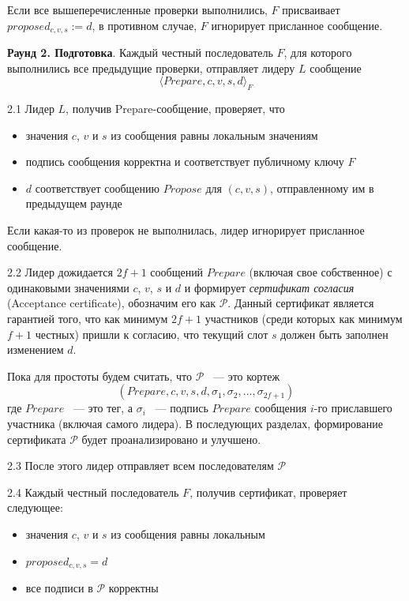 Если все вышеперечисленные проверки выполнились, $F$ присваивает $proposed_{c,v,s} := d$, в противном случае, $F$ игнорирует присланное сообщение. 
\vspace{10pt}

\textbf{Раунд 2. Подготовка}. Каждый честный последователь $F$, для которого выполнились все предыдущие проверки, отправляет лидеру $L$ сообщение 
\[ \langle Prepare, c, v, s, d \rangle_F \]

2.1 Лидер $L$, получив Prepare-сообщение, проверяет, что
\begin{itemize}
\item значения $c$, $v$ и $s$ из сообщения равны локальным значениям
\item подпись сообщения корректна и соответствует публичному ключу $F$
\item $d$ соответствует сообщению $Propose$ для $(c, v, s)$, отправленному им в предыдущем раунде
\end{itemize}
Если какая-то из проверок не выполнилась, лидер игнорирует присланное сообщение. 

2.2 Лидер дожидается $2f+1$ сообщений $Prepare$ (включая свое собственное) с одинаковыми значениями $c$, $v$, $s$ и $d$ и формирует \textit{сертификат согласия} (Acceptance certificate), обозначим его как $\mathcal{P}$. Данный сертификат является гарантией того, что как минимум $2f+1$ участников (среди которых как минимум $f+1$ честных) пришли к согласию, что текущий слот $s$ должен быть заполнен изменением $d$.

Пока для простоты будем считать, что $\mathcal{P}$ ~--- это кортеж
$$(Prepare, c, v, s, d, \sigma_1, \sigma_2, ..., \sigma_{2f+1})$$
где $Prepare$ ~--- это тег, а $\sigma_i$ ~--- подпись $Prepare$ сообщения $i$-го приславшего участника (включая самого лидера). 
В последующих разделах, формирование сертификата $\mathcal{P}$ будет проанализировано и улучшено.

2.3 После этого лидер отправляет всем последователям  $\mathcal{P}$

2.4 Каждый честный последователь $F$, получив сертификат, проверяет следующее:
\begin{itemize}
\item значения $c$, $v$ и $s$ из сообщения равны локальным
\item $proposed_{c,v,s} = d$
\item все подписи в $\mathcal{P}$ корректны
\end{itemize}
\vspace{10pt}


